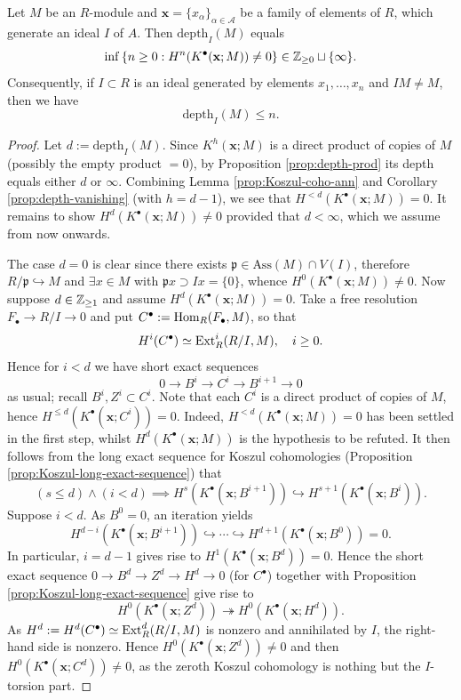 \begin{theorem}\label{prop:Koszul-depth}
	Let $M$ be an $R$-module and $\mathbf{x} = \{x_\alpha \}_{\alpha \in \mathcal{A}}$ be a family of elements of $R$, which generate an ideal $I$ of $A$. Then $\mathrm{depth}_I(M)$ equals
	\[ \inf \left\{n \geq 0: H^n(K^\bullet(\mathbf{x}; M)) \neq 0 \right\} \in \mathbb{Z}_{\geq 0} \sqcup \{\infty \} . \]
	Consequently, if $I \subset R$ is an ideal generated by elements $x_1, \ldots, x_n$ and $IM \neq M$, then we have
	\[ \mathrm{depth}_I(M) \leq n. \]
\end{theorem}
\begin{proof}
	Let $d := \text{depth}_I(M)$. Since $K^h(\mathbf{x}; M)$ is a direct product of copies of $M$ (possibly the empty product $=0$), by Proposition \ref{prop:depth-prod} its depth equals either $d$ or $\infty$. Combining Lemma \ref{prop:Koszul-coho-ann} and Corollary \ref{prop:depth-vanishing} (with $h = d-1$), we see that $H^{< d}(K^\bullet(\mathbf{x}; M)) = 0$. It remains to show $H^d(K^\bullet(\mathbf{x}; M)) \neq 0$ provided that $d < \infty$, which we assume from now onwards.

	The case $d=0$ is clear since there exists $\mathfrak{p} \in \text{Ass}(M) \cap V(I)$, therefore $R/\mathfrak{p} \hookrightarrow M$ and $\exists x \in M$ with $\mathfrak{p} x \supset Ix = \{0\}$, whence $H^0(K^\bullet(\mathbf{x}; M)) \neq 0$. Now suppose $d \in \mathbb{Z}_{\geq 1}$ and assume $H^d(K^\bullet(\mathbf{x}; M)) = 0$. Take a free resolution $F_\bullet \to R/I \to 0$ and put $C^\bullet := \operatorname{Hom}_R(F_\bullet, M)$, so that
	\[ H^i(C^\bullet) \simeq \operatorname{Ext}^i_R(R/I, M), \quad i \geq 0. \]
	Hence for $i < d$ we have short exact sequences
	\[ 0 \to B^i \to C^i \to B^{i+1} \to 0 \]
	as usual; recall $B^i, Z^i \subset C^i$. Note that each $C^i$ is a direct product of copies of $M$, hence $H^{\leq d}(K^\bullet(\mathbf{x}; C^i)) = 0$. Indeed, $H^{< d}(K^\bullet(\mathbf{x}; M))=0$ has been settled in the first step, whilst $H^d(K^\bullet(\mathbf{x}; M))$ is the hypothesis to be refuted. It then follows from the long exact sequence for Koszul cohomologies (Proposition \ref{prop:Koszul-long-exact-sequence}) that
	\[ (s \leq d) \wedge (i < d) \implies H^s(K^\bullet(\mathbf{x}; B^{i+1})) \hookrightarrow H^{s+1}(K^\bullet(\mathbf{x}; B^i)). \]
	Suppose $i < d$. As $B^0 = 0$, an iteration yields
	\[ H^{d-i}(K^\bullet(\mathbf{x}; B^{i+1})) \hookrightarrow \cdots \hookrightarrow H^{d+1}(K^\bullet(\mathbf{x}; B^0)) = 0. \]
	In particular, $i=d-1$ gives rise to $H^1(K^\bullet(\mathbf{x}; B^d)) = 0$. Hence the short exact sequence $0 \to B^d \to Z^d \to H^d \to 0$ (for $C^\bullet$) together with Proposition \ref{prop:Koszul-long-exact-sequence} give rise to
	\[ H^0(K^\bullet(\mathbf{x}; Z^d)) \twoheadrightarrow H^0(K^\bullet(\mathbf{x}; H^d)). \]
	As $H^d := H^d(C^\bullet) \simeq \operatorname{Ext}^d_R(R/I, M)$ is nonzero and annihilated by $I$, the right-hand side is nonzero. Hence $H^0(K^\bullet(\mathbf{x}; Z^d)) \neq 0$ and then $H^0(K^\bullet(\mathbf{x}; C^d)) \neq 0$, as the zeroth Koszul cohomology is nothing but the $I$-torsion part.
	

\end{proof}
